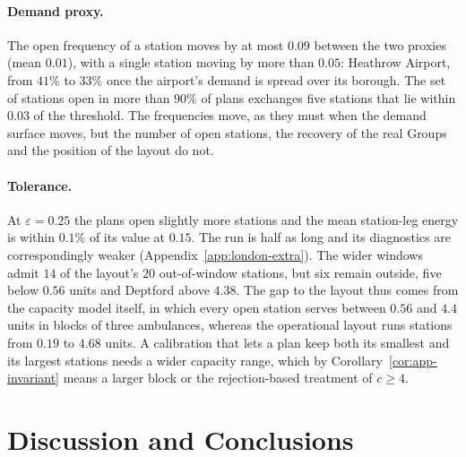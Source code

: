 \documentclass[11pt]{article}
\theoremstyle{definition}
\begin{document}
\begin{table}[!htbp]
\centering
\small
\resizebox{\linewidth}{!}{}
\caption{The London study under the baseline, under a uniform within-borough demand proxy, and under a tolerance of $0.25$. ``Outside every window'' counts the stations of the operational layout whose load lies outside the widest window of every capacity at the tolerance of the column.}
\label{tab:las-sens}
\end{table}

\paragraph{Demand proxy.}
The open frequency of a station moves by at most $0.09$ between the two proxies (mean $0.01$), with a single station moving by more than $0.05$: Heathrow Airport, from $41\%$ to $33\%$ once the airport's demand is spread over its borough. The set of stations open in more than $90\%$ of plans exchanges five stations that lie within $0.03$ of the threshold. The frequencies move, as they must when the demand surface moves, but the number of open stations, the recovery of the real Groups and the position of the layout do not.

\paragraph{Tolerance.}
At $\varepsilon = 0.25$ the plans open slightly more stations and the mean station-leg energy is within $0.1\%$ of its value at $0.15$. The run is half as long and its diagnostics are correspondingly weaker (Appendix~\ref{app:london-extra}). The wider windows admit $14$ of the layout's $20$ out-of-window stations, but six remain outside, five below $0.56$ units and Deptford above $4.38$. The gap to the layout thus comes from the capacity model itself, in which every open station serves between $0.56$ and $4.4$ units in blocks of three ambulances, whereas the operational layout runs stations from $0.19$ to $4.68$ units. A calibration that lets a plan keep both its smallest and its largest stations needs a wider capacity range, which by Corollary~\ref{cor:app-invariant} means a larger block or the rejection-based treatment of $c \ge 4$.


\section{Discussion and Conclusions}
\label{sec:discussion}
\end{document}
